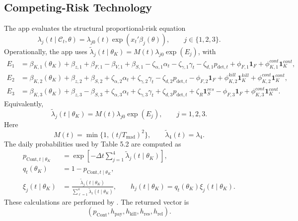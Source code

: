 \documentclass[ecta,nameyear,final,supplement]{econsocart}
\numberwithin{equation}{section}
\newcommand{\Ind}{\mathbf{1}}
\newcommand{\thetak}{\theta_K}
\newcommand{\lambdat}{\widetilde{\lambda}}
\begin{document}
\subsection{Competing-Risk Technology}
\label{sec:app-risk}

The app evaluates the structural proportional-risk equation
\begin{equation}
\lambda_j(t\mid\mathcal C_t,\theta)
=
\lambda_{j0}(t)\exp(x_t'\beta_j(\theta)),
\qquad j\in\{1,2,3\}.
\label{eq:app-lambda-main}
\end{equation}
Operationally, the app uses
$\lambdat_j(t\mid\thetak)=M(t)\lambda_{j0}\exp(E_j)$, with
\begingroup\small
\begin{align}
E_1
&=
\beta_{K,1}(\thetak)+\beta_{z,1}+\beta_{F,1}-\beta_{V,1}
+\beta_{S,1}
-\zeta_{\alpha,1}\alpha_t-\zeta_{\gamma,1}\gamma_t
-\zeta_{d,1}p_{\mathrm{det},t}
+\phi_{F,1}\Ind_F+\phi_{K,1}^{cont}\Ind_K^{cont},
\label{eq:app-exp-pay}\\
E_2
&=
\beta_{K,2}(\thetak)+\beta_{z,2}+\beta_{S,2}
+\zeta_{\alpha,2}\alpha_t+\zeta_{\gamma,2}\gamma_t
-\zeta_{d,2}p_{\mathrm{det},t}
-\phi_{F,2}\Ind_F+\phi_{K,2}^{kill}\Ind_K^{kill}
+\phi_{K,2}^{cont}\Ind_K^{cont},
\label{eq:app-exp-kill}\\
E_3
&=
\beta_{K,3}(\thetak)+\beta_{z,3}-\beta_{S,3}
+\zeta_{\alpha,3}\alpha_t+\zeta_{\gamma,3}\gamma_t
+\zeta_{d,3}p_{\mathrm{det},t}
+\zeta_R\Ind_S^{res}
-\phi_{F,3}\Ind_F+\phi_{K,3}^{cont}\Ind_K^{cont}.
\label{eq:app-exp-res}
\end{align}
\endgroup
Equivalently,
\begin{equation}
\lambdat_j(t\mid\thetak)=M(t)\lambda_{j0}\exp(E_j),
\qquad j=1,2,3.
\label{eq:app-lambda-strategic}
\end{equation}
Here
\begin{equation}
M(t)=\min\{1,(t/T_{\mathrm{mad}})^2\},
\qquad
\lambdat_4(t)=\lambda_4.
\label{eq:app-maturity-lambda4}
\end{equation}
The daily probabilities used by Table 5.2 are computed as
\begin{align}
p_{\mathrm{Cont},t\mid\thetak}
&=
\exp\!\left[-\Delta t\sum_{j=1}^{4}\lambdat_j(t\mid\thetak)\right],
\label{eq:app-pcont}\\
q_t(\thetak)&=1-p_{\mathrm{Cont},t\mid\thetak},
\label{eq:app-q}\\
\xi_j(t\mid\thetak)
&=
\frac{\lambdat_j(t\mid\thetak)}
{\sum_{\ell=1}^{4}\lambdat_\ell(t\mid\thetak)},
\qquad
h_j(t\mid\thetak)=q_t(\thetak)\xi_j(t\mid\thetak).
\label{eq:app-xi-h}
\end{align}
These calculations are performed by .
The returned vector is
\[
\left(
p_{\mathrm{Cont}},h_{\mathrm{pay}},h_{\mathrm{kill}},
h_{\mathrm{res}},h_{\mathrm{rel}}
\right).
\]
\end{document}
